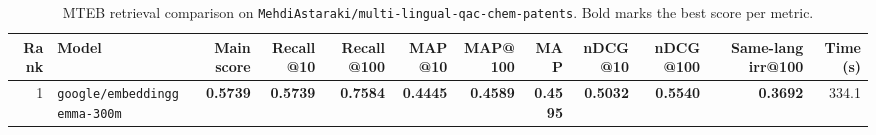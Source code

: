 \begin{table}[t]
\centering
\small
\begin{tabular}{r l r r r r r r r r r r}
\hline
Rank & Model & Main score & Recall@10 & Recall@100 & MAP@10 & MAP@100 & MAP & nDCG@10 & nDCG@100 & Same-lang irr@100 & Time (s) \\
\hline
1 & \texttt{google/embeddinggemma-300m} & \textbf{0.5739} & \textbf{0.5739} & \textbf{0.7584} & \textbf{0.4445} & \textbf{0.4589} & \textbf{0.4595} & \textbf{0.5032} & \textbf{0.5540} & \textbf{0.3692} & 334.1 \\
\hline
\end{tabular}
\caption{MTEB retrieval comparison on \texttt{MehdiAstaraki/multi-lingual-qac-chem-patents}. Bold marks the best score per metric.}
\label{tab:mteb-model-comparison}
\end{table}
